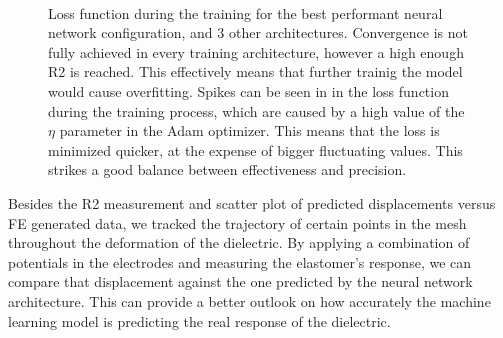 \begin{figure}
  \begin{center}
     \qquad
     \\
     \qquad
  \end{center}
  \caption{Loss function during the training for the best performant neural network configuration, and 3 other architectures. Convergence is not fully achieved in every training architecture, however a high enough R2 is reached. This effectively means that further trainig the model would cause overfitting. Spikes can be seen in in the loss function during the training process, which are caused by a high value of the $\eta$ parameter in the Adam optimizer. This means that the loss is minimized quicker, at the expense of bigger fluctuating values. This strikes a good balance between effectiveness and precision.}
  \label{fig: losses}
\end{figure}
\pagebreak

Besides the R2 measurement and scatter plot of predicted displacements versus FE generated data, we tracked the trajectory of certain points in the mesh throughout the deformation of the dielectric. By applying a combination of potentials in the electrodes and measuring the elastomer's response, we can compare that displacement against the one predicted by the neural network architecture. This can provide a better outlook on how accurately the machine learning model is predicting the real response of the dielectric. 

